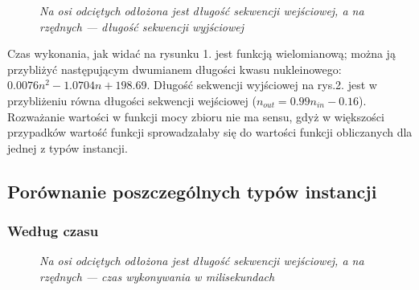 \documentclass{article}
\begin{document}
\begin{figure}[h]
\caption{\textit{Na osi odciętych odłożona jest długość sekwencji wejściowej, a na rzędnych --- długość sekwencji wyjściowej}}
\end{figure}

Czas wykonania, jak widać na rysunku 1. jest funkcją wielomianową; można ją przybliżyć następującym dwumianem długości kwasu nukleinowego: $0.0076n^2-1.0704n+198.69$.
Długość sekwencji wyjściowej na rys.2. jest w przybliżeniu równa długości sekwencji wejściowej ($n_{out} = 0.99n_{in}-0.16$).
Rozważanie wartości w funkcji mocy zbioru nie ma sensu, gdyż w większości przypadków wartość funkcji sprowadzałaby się do wartości funkcji obliczanych dla jednej z typów instancji.

\subsection{Porównanie poszczególnych typów instancji}

\subsubsection{Według czasu}

\begin{figure}[!htbp]
\caption{\textit{Na osi odciętych odłożona jest długość sekwencji wejściowej, a na rzędnych --- czas wykonywania w milisekundach}}
\end{figure}
\end{document}
